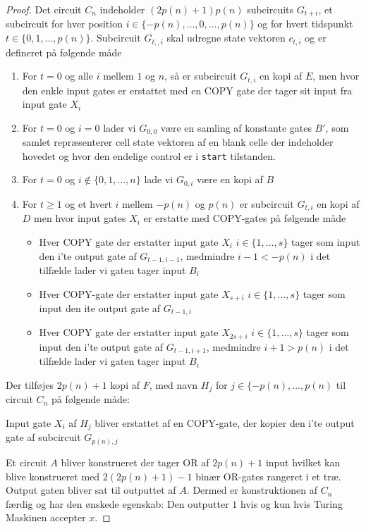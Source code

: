 \begin{itemize}
\begin{proof}
  Det circuit $C_n$ indeholder $(2p(n)+1)p(n)$ subcircuits $G_{t+i}$, et subcircuit for hver position $i \in \{-p(n), \dots, 0, \dots, p(n)\}$ og for hvert tidspunkt $t \in \{0,1,\dots,p(n)\}$. Subcircuit $G_{t,,i}$ skal udregne state vektoren $c_{t,i}$ og er defineret på følgende måde
  \begin{enumerate}
  	\item For $t=0$ og alle $i$ mellem $1$ og $n$, så er subcircuit $G_{t,i}$ en kopi af $E$, men hvor den enkle input gates er erstattet med en COPY gate der tager sit input fra input gate $X_i$ 
  	\item For $t=0$ og $i=0$ lader vi $G_{0,0}$ være en samling af konstante gates $B'$, som samlet repræsenterer cell state vektoren af en blank celle der indeholder hovedet og hvor den endelige control er i \texttt{start} tilstanden. 
  	\item For $t=0$ og $i \notin \{0,1,\dots,n\}$ lade vi $G_{0,i}$ være en kopi af $B$
  	\item For $t \geq 1$ og et hvert $i$ mellem $-p(n)$ og $p(n)$ er subcircuit $G_{t,i}$ en kopi af $D$ men hvor input gates $X_i$ er erstatte med COPY-gates på følgende måde
    \begin{itemize}
    	\item Hver COPY gate der erstatter input gate $X_i$ $i \in \{1,\dots,s\}$ tager som input den i'te output gate af $G_ {t-1,i-1}$, medmindre $i-1 < -p(n)$ i det tilfælde lader vi gaten tager input $B_i$ 
      \item Hver COPY-gate der erstatter input gate $X_{s+i}$ $i \in \{1,\dots,s\}$ tager som input den ite output gate af $G_{t-1,i}$  
    	\item Hver COPY gate der erstatter input gate $X_{2s+i}$ $i \in \{1,\dots,s\}$ tager som input den i'te output gate af $G_ {t-1,i+1}$, medmindre $i+1 > p(n)$ i det tilfælde lader vi gaten tager input $B_i$ 
    \end{itemize}
  \end{enumerate}
  Der tilføjes $2p(n)+1$ kopi af $F$, med navn $H_{j}$ for $j \in \{-p(n), \dots, p(n)$ til circuit $C_n$ på følgende måde: \smallskip

  Input gate $X_i$ af $H_j$ bliver erstattet af en COPY-gate, der kopier den i'te output gate af subcircuit $G_{p(n),j}$ \smallskip
  
  Et circuit $A$ bliver konstrueret der tager OR af $2p(n)+1$ input hvilket kan blive konstrueret med $2(2p(n)+1)  -1$ binær OR-gates rangeret i et træ. Output gaten bliver sat til outputtet af $A$. Dermed er konstruktionen af $C_n$ færdig og har den ønskede egenskab: Den outputter $1$ hvis og kun hvis Turing Maskinen accepter $x$. 


\end{proof}
\end{itemize}
